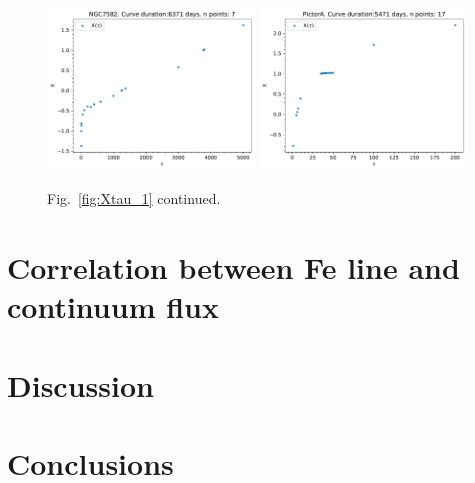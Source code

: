 \begin{figure}
\begin{center}
    {
  \includegraphics[width=0.49\textwidth]{Figs/Chapter5/X_tau_NGC7582.pdf}  \hfill
  \includegraphics[width=0.49\textwidth]{Figs/Chapter5/X_tau_PictorA.pdf}
  \caption{Fig.~\ref{fig:Xtau_1} continued.}
    \label{fig:Xtau_3}
  }
\end{center}
\end{figure}

\section{Correlation between Fe line and continuum flux}
\section{Discussion}
\section{Conclusions}